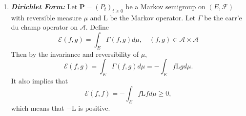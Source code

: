 \begin{enumerate}[label=\arabic{*}.]
	When $\mu$ is symmetric, $\mathrm{L} = \mathrm{L}^*$ implies that
	\begin{equation*}
	    \partial_t p_t(x, y)=\mathrm{L}_x p_t(x, y)=\mathrm{L}_y p_t(x, y),
	\end{equation*}

	\item \textbf{\emph{Dirichlet Form:}} Let $\mathbf{P} = (P_t)_{t \geq 0}$ be a Markov semigroup on $(E,\mathcal{F})$ with reversible measure $\mu$ and $\mathrm{L}$ be the Markov operator. Let $\Gamma$ be the carr'e du champ operator on $\mathcal{A}$. Define
	\begin{equation*}
	    \mathcal{E}(f, g)=\int_E \Gamma(f, g) d \mu, \quad(f, g) \in \mathcal{A} \times \mathcal{A}
	\end{equation*}
	Then by the invariance and reversibility of $\mu$,
	\begin{equation*}
	    \mathcal{E}(f, g)=\int_E \Gamma(f, g) d \mu=-\int_E f \mathrm{L} g d \mu.
	\end{equation*}
	It also implies that
	\begin{equation*}
	     \mathcal{E}(f,f) = -\int_E f \mathrm{L} f d \mu \geq 0,
	\end{equation*}
	which means that $-\mathrm{L}$ is positive.


\end{enumerate}
